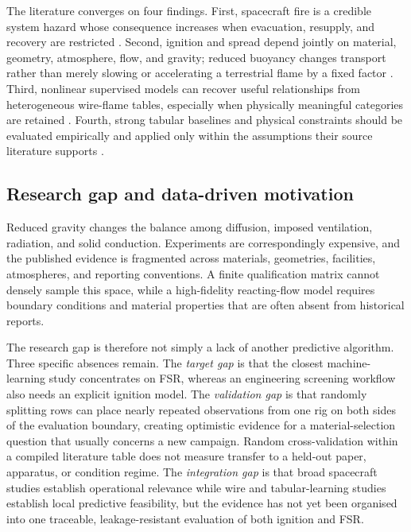 The literature converges on four findings. First, spacecraft fire is a credible system hazard whose consequence increases when evacuation, resupply, and recovery are restricted \cite{guibaud2022spacecraft}. Second, ignition and spread depend jointly on material, geometry, atmosphere, flow, and gravity; reduced buoyancy changes transport rather than merely slowing or accelerating a terrestrial flame by a fixed factor \cite{guibaud2022spacecraft,riveraWireML}. Third, nonlinear supervised models can recover useful relationships from heterogeneous wire-flame tables, especially when physically meaningful categories are retained \cite{riveraWireML}. Fourth, strong tabular baselines and physical constraints should be evaluated empirically and applied only within the assumptions their source literature supports \cite{shwartzZiv2022tabular,raissi2019pinn,karniadakis2021physicsinformed}.

\subsection{Research gap and data-driven motivation}

Reduced gravity changes the balance among diffusion, imposed ventilation, radiation, and solid conduction. Experiments are correspondingly expensive, and the published evidence is fragmented across materials, geometries, facilities, atmospheres, and reporting conventions. A finite qualification matrix cannot densely sample this space, while a high-fidelity reacting-flow model requires boundary conditions and material properties that are often absent from historical reports.

The research gap is therefore not simply a lack of another predictive algorithm. Three specific absences remain. The \emph{target gap} is that the closest machine-learning study concentrates on FSR, whereas an engineering screening workflow also needs an explicit ignition model. The \emph{validation gap} is that randomly splitting rows can place nearly repeated observations from one rig on both sides of the evaluation boundary, creating optimistic evidence for a material-selection question that usually concerns a new campaign. Random cross-validation within a compiled literature table does not measure transfer to a held-out paper, apparatus, or condition regime. The \emph{integration gap} is that broad spacecraft studies establish operational relevance while wire and tabular-learning studies establish local predictive feasibility, but the evidence has not yet been organised into one traceable, leakage-resistant evaluation of both ignition and FSR.

